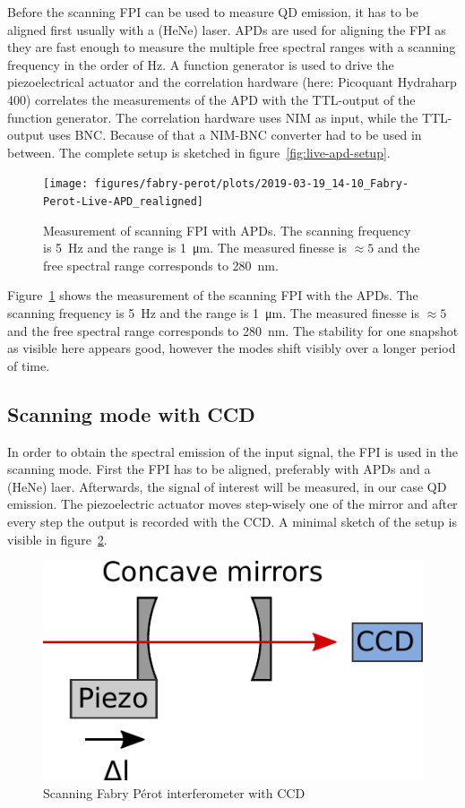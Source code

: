 Before the scanning \ac{FPI} can be used to measure \ac{QD} emission, it has to be aligned first usually with a (HeNe) laser.
\acp{APD} are used for aligning the \ac{FPI} as they are fast enough to measure the multiple free spectral ranges with a scanning frequency in the order of \si{\hertz}.
A function generator is used to drive the piezoelectrical actuator and the correlation hardware (here: Picoquant Hydraharp 400) correlates the measurements of the \ac{APD} with the TTL-output of the function generator.
The correlation hardware uses \ac{NIM} as input, while the TTL-output uses \ac{BNC}.
Because of that a \ac{NIM}-\ac{BNC} converter had to be used in between.
The complete setup is sketched in figure~\ref{fig:live-apd-setup}.
\begin{figure}[H]
	\centering
	\texttt{[image: figures/fabry-perot/plots/2019-03-19\_14-10\_Fabry-Perot-Live-APD\_realigned]}
	\caption{Measurement of scanning FPI with APDs.
		The scanning frequency is \SI{5}{\hertz} and the range is \SI{1}{\micro \meter}.
		The measured finesse is $\approx 5$ and the free spectral range corresponds to \SI{280}{\nano \meter}.}
	\label{fig:2019-03-1914-10fabry-perot-live-apdrealigned}
\end{figure}
Figure~\ref{fig:2019-03-1914-10fabry-perot-live-apdrealigned} shows the measurement of the scanning \ac{FPI} with the \acp{APD}.
The scanning frequency is \SI{5}{\hertz} and the range is \SI{1}{\micro \meter}.
The measured finesse is $\approx 5$ and the free spectral range corresponds to \SI{280}{\nano \meter}.
The stability for one snapshot as visible here appears good, however the modes shift visibly over a longer period of time.

  
\subsection{Scanning mode with CCD}

In order to obtain the spectral emission of the input signal, the \ac{FPI} is used in the scanning mode.
First the \ac{FPI} has to be aligned, preferably with \acp{APD} and a (HeNe) laer.
Afterwards, the signal of interest will be measured, in our case \ac{QD} emission.
The piezoelectric actuator moves step-wisely one of the mirror and after every step the output is recorded with the \ac{CCD}.
A minimal sketch of the setup is visible in figure~\ref{fig:setup}.
\begin{figure}[H]
	\centering
	\includegraphics[width=0.5\linewidth]{figures/fabry-perot/setup/setup}
	\caption{Scanning Fabry Pérot interferometer with CCD}
	\label{fig:setup}
\end{figure}




